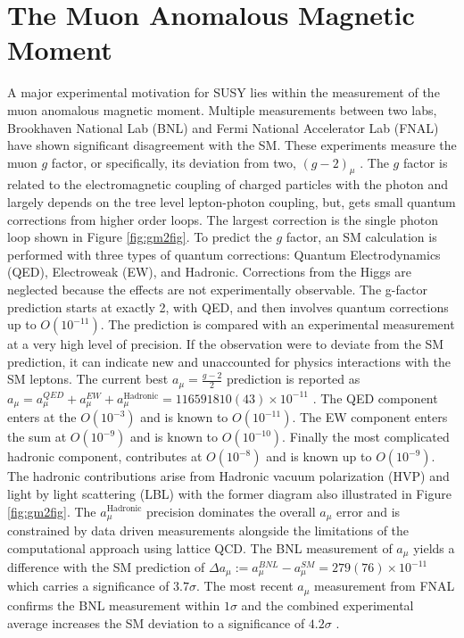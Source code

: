 \section{The Muon Anomalous Magnetic Moment}

A major experimental motivation for SUSY lies within the measurement of the muon anomalous magnetic moment.  Multiple measurements between two labs, Brookhaven National Lab (BNL) and Fermi National Accelerator Lab (FNAL) have shown significant disagreement with the SM. These experiments measure the muon $g$ factor, or specifically, its deviation from two, $(g-2)_\mu$ .  The $g$ factor is related to the electromagnetic coupling of charged particles with the photon and largely depends on the tree level lepton-photon coupling, but, gets small quantum corrections from higher order loops. The largest correction is the single photon loop shown in Figure \ref{fig:gm2fig}. To predict the $g$ factor, an SM calculation is performed with three types of quantum corrections: Quantum Electrodynamics (QED), Electroweak (EW), and Hadronic. Corrections from the Higgs are neglected because the effects are not experimentally observable. %
The g-factor prediction starts at exactly 2, with QED, and then involves quantum corrections up to $O(10^{-11})$. The prediction is compared with an experimental measurement at a very high level of precision. If the observation were to deviate from the SM prediction, it can indicate new and unaccounted for physics interactions with the SM leptons.
The current best $a_\mu = \frac{g-2}{2}$ prediction is reported as $a_\mu= a_\mu^{QED}+ a_\mu^{EW}+a_\mu^{\text{Hadronic}} =  116 591 810(43) \times 10^{-11}$ \cite{Muong-2:2021ojo}.
The QED component enters at the $O(10^{-3})$ and is known to $O(10^{-11})$. The EW component enters the sum at $O(10^{-9})$ and is known to $O(10^{-10})$. Finally the most complicated hadronic component, contributes at $O(10^{-8})$ and is known up to $O(10^{-9})$. The hadronic contributions arise from Hadronic vacuum polarization (HVP) and light by light scattering (LBL) with the former diagram also illustrated in Figure \ref{fig:gm2fig}. The $a_\mu^{\text{Hadronic}}$ precision dominates the overall $a_\mu$ error and is constrained by data driven measurements alongside the limitations of the computational approach using lattice QCD. The BNL measurement of $a_\mu$ yields a difference with the SM prediction of $\Delta a_\mu := a_\mu^{BNL} - a_\mu^{SM} = 279(76) \times 10^{-11}$ which carries a significance of $3.7\sigma$. The most recent $a_\mu$ measurement from FNAL confirms the BNL measurement within $1\sigma$ and the combined experimental average increases the SM deviation to a significance of $4.2\sigma$ \cite{Muong-2:2021ojo}.


